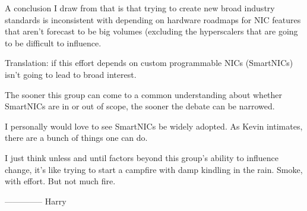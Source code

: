 \documentclass[../../../OAE-SPEC-MAIN.tex]{subfiles}
\begin{document}
A conclusion I draw from that is that trying to create new broad industry standards is inconsistent with depending on hardware roadmaps for NIC features that aren’t forecast to be big volumes (excluding the hyperscalers that are going to be difficult to influence.

Translation: if this effort depends on custom programmable NICs (SmartNICs) isn’t going to lead to broad interest.

The sooner this group can come to a common understanding about whether SmartNICs are in or out of scope, the sooner the debate can be narrowed.

I personally would love to see SmartNICs be widely adopted. As Kevin intimates, there are a bunch of things one can do.

I just think unless and until factors beyond this group’s ability to influence change, it’s like trying to start a campfire with damp kindling in the rain. Smoke, with effort. But not much fire.


\bigskip
% 
--------------
Harry
\end{document}

